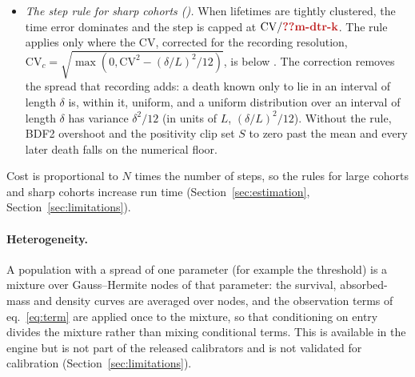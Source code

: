 \begin{itemize}[leftmargin=1.5em,itemsep=1pt]
    contraction $q$ is a chosen value. It is slower than the measured median on non-human cohorts
    () but faster than on human cohorts (), so the rule under-refines large human
    life tables.
  \item \emph{The step rule for sharp cohorts ().} When lifetimes are tightly clustered, the time error dominates
    and the step is capped at $\mathrm{CV}/\C{m-dtr-k}$. The rule applies only where the CV, corrected for the recording
    resolution, $\mathrm{CV}_c=\sqrt{\max(0,\mathrm{CV}^2-(\delta/L)^2/12)}$, is below . The correction removes the
    spread that recording adds: a death known only to lie in an interval of length $\delta$ is, within it, uniform, and a
    uniform distribution over an interval of length $\delta$ has variance $\delta^2/12$ (in units of $L$, $(\delta/L)^2/12$).
    Without the rule, BDF2 overshoot and the
    positivity clip set $S$ to zero past the mean and every later death falls on the numerical floor.
\end{itemize}
Cost is proportional to $N$ times the number of steps, so the rules for large cohorts and sharp cohorts increase run time
(Section~\ref{sec:estimation}, Section~\ref{sec:limitations}).
\paragraph{Heterogeneity.} A population with a spread of one parameter (for example the threshold) is a mixture over
Gauss--Hermite nodes of that parameter: the survival, absorbed-mass and density curves are averaged over nodes, and the
observation terms of eq.~\eqref{eq:term} are applied once to the mixture, so that conditioning on entry divides the
mixture rather than mixing conditional terms. This is available in the engine but is not part of the released calibrators
and is not validated for calibration (Section~\ref{sec:limitations}).
